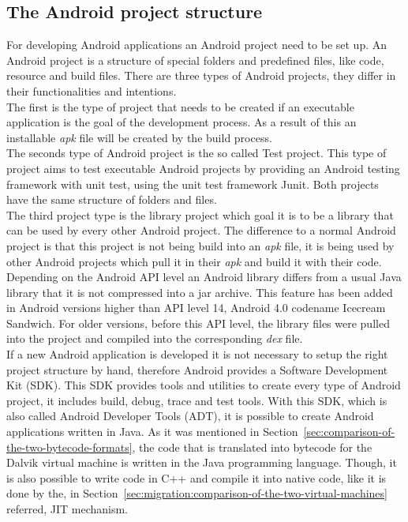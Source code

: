 \subsection{The Android project structure}
\label{sec:migration:the-android-project-structure}
For developing Android applications an Android project need to be set up.
An Android project is a structure of special folders and predefined files, like code, resource and build files.
There are three types of Android projects, they differ in their functionalities and intentions.\\
The first is the type of project that needs to be created if an executable application is the goal of the development process.
As a result of this an installable \textit{apk} file will be created by the build process.\\
The seconds type of Android project is the so called Test project.
This type of project aims to test executable Android projects by providing an Android testing framework with unit test, using the unit test framework Junit.
Both projects have the same structure of folders and files.\\
The third project type is the library project which goal it is to be a library that can be used by every other Android project.
The difference to a normal Android project is that this project is not being build into an \textit{apk} file, it is being used by other Android projects which pull it in their \textit{apk} and build it with their code.
Depending on the Android API level an Android library differs from a usual Java library that it is not compressed into a jar archive.
This feature has been added in Android versions higher than API level 14, Android 4.0 codename Icecream Sandwich.
For older versions, before this API level, the library files were pulled into the project and compiled into the corresponding \textit{dex} file.\\
If a new Android application is developed it is not necessary to setup the right project structure by hand, therefore Android provides a Software Development Kit (SDK).
This SDK provides tools and utilities to create every type of Android project, it includes build, debug, trace and test tools.
With this SDK, which is also called Android Developer Tools (ADT), it is possible to create Android applications written in Java.
As it was mentioned in Section~\ref{sec:comparison-of-the-two-bytecode-formats}, the code that is translated into bytecode for the Dalvik virtual machine is written in the Java programming language.
Though, it is also possible to write code in C++ and compile it into native code, like it is done by the, in Section~\ref{sec:migration:comparison-of-the-two-virtual-machines} referred, JIT mechanism.
